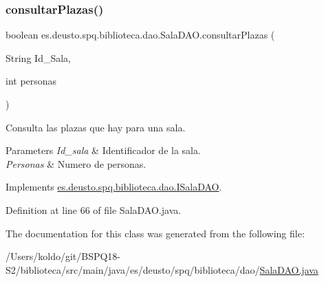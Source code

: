 \subsubsection{\texorpdfstring{consultar\+Plazas()}{consultarPlazas()}}
{\footnotesize\ttfamily boolean es.\+deusto.\+spq.\+biblioteca.\+dao.\+Sala\+D\+A\+O.\+consultar\+Plazas (\begin{DoxyParamCaption}\item[{String}]{Id\+\_\+\+Sala,  }\item[{int}]{personas }\end{DoxyParamCaption})}

Consulta las plazas que hay para una sala. 
\begin{DoxyParams}{Parameters}
{\em Id\+\_\+sala} & Identificador de la sala. \\
\hline
{\em Personas} & Numero de personas. \\
\hline
\end{DoxyParams}


Implements \mbox{\hyperlink{interfacees_1_1deusto_1_1spq_1_1biblioteca_1_1dao_1_1_i_sala_d_a_o_af12c5fe6a1abe11bc65e1118d991f926}{es.\+deusto.\+spq.\+biblioteca.\+dao.\+I\+Sala\+D\+AO}}.



Definition at line 66 of file Sala\+D\+A\+O.\+java.



The documentation for this class was generated from the following file\+:\begin{DoxyCompactItemize}
\item 
/\+Users/koldo/git/\+B\+S\+P\+Q18-\/\+S2/biblioteca/src/main/java/es/deusto/spq/biblioteca/dao/\mbox{\hyperlink{_sala_d_a_o_8java}{Sala\+D\+A\+O.\+java}}\end{DoxyCompactItemize}
